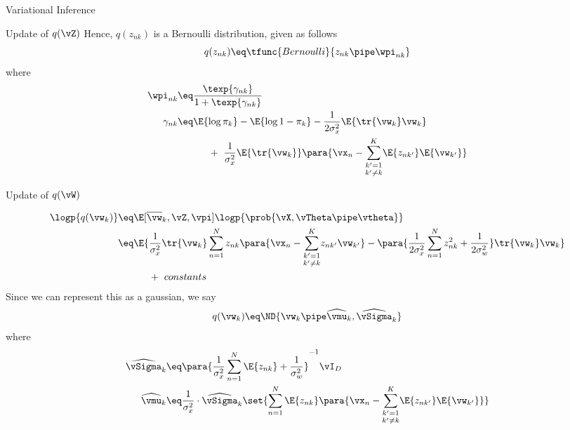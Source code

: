 \documentclass{article}
\begin{document}
\begin{question}
\begin{qsection}{Variational Inference}
\begin{qsubsection}{\boldmath Update of $q(\vZ)$}
			Hence, $q(z_{nk})$ is a Bernoulli distribution, given as follows
			\begin{equation}
				q(z_{nk})	\eq	\tfunc{Bernoulli}{z_{nk} \pipe \wpi_{nk}}
				\label{eq:q4-q-z}
			\end{equation}
			where
			\begin{align}
				\wpi_{nk}	&\eq	\frac{\texp{\gamma_{nk}}}{1 + \texp{\gamma_{nk}}} \nonumber \\
				\gamma_{nk}	&\eq	\E{\log{\pi_k}} - \E{\log{1 - \pi_k}}	- \frac{1}{2 \sigma_x^2} \E{\tr{\vw_k} \vw_k} \label{eq:q4-gamma} \\
				&\hspace{1.1cm} + \ \frac{1}{\sigma_x^2} \E{\tr{\vw_k}} \para{\vx_n - \underset{k' \ne k}{\sum_{k' = 1}^K} \E{z_{nk'}} \E{\vw_{k'}}} \nonumber
			\end{align}

		\end{qsubsection}

		\begin{qsubsection}{\boldmath Update of $q(\vW)$}

			\begin{align*}
				\logp{q(\vw_k)}	&\eq	\E[\overline{\vw}_k, \vZ, \vpi]{\logp{\prob{\vX, \vTheta \pipe \vtheta}}} \\
				&\eq	\E{\frac{1}{\sigma_x^2} \tr{\vw_k} \sum_{n = 1}^N z_{nk} \para{\vx_n - \underset{k' \ne k}{\sum_{k' = 1}^K} z_{nk'} \vw_{k'}} - \para{\frac{1}{2 \sigma_x^2} \sum_{n = 1}^N z_{nk}^2 + \frac{1}{2 \sigma_w^2}} \tr{\vw_k} \vw_k} \\
				&\hspace{1.1cm} + \ constants
			\end{align*}
			Since we can represent this as a gaussian, we say
			\begin{equation}
				q(\vw_k)	\eq	\ND{\vw_k \pipe \widehat{\vmu}_k, \widehat{\vSigma}_k}
				\label{eq:q4-q-w}
			\end{equation}
			where
			\begin{align*}
				\widehat{\vSigma}_k	&\eq	\para{\frac{1}{\sigma_x^2} \sum_{n = 1}^N \E{z_{nk}} + \frac{1}{\sigma_w^2}}^{-1} \vI_D \\
				\widehat{\vmu}_k	&\eq	\frac{1}{\sigma_x^2} \cdot \widehat{\vSigma}_k \set{\sum_{n = 1}^N \E{z_{nk}} \para{\vx_n - \underset{k' \ne k}{\sum_{k' = 1}^K} \E{z_{nk'}} \E{\vw_{k'}}}}
			\end{align*}

		\end{qsubsection}


\end{qsection}
\end{question}
\end{document}
